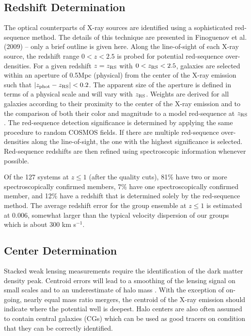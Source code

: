 \documentclass[12pt]{emulateapj}
\newcommand{\pgroup}{127 }      %
\newcommand{\eg}{{\it e.g.}}
\begin{document}
\subsection{Redshift Determination}\label{redshift_determination}

The optical counterparts of X-ray sources are identified using a
sophisticated red-sequence method. The details of this technique are
presented in Finoguenov et al. (2009) -- only a brief outline is given
here. Along the line-of-sight of each X-ray source, the redshift range
$0<z<2.5$ is probed for potential red-sequence over-densities. For a
given redshift $z=z_{\rm RS}$ with $0<z_{\rm RS}<2.5$, galaxies are
selected within an aperture of 0.5Mpc (physical) from the center of
the X-ray emission such that $|z_{\rm phot}-z_{\rm RS}|<0.2$. The
apparent size of the aperture is defined in terms of a physical scale
and will vary with $z_{\rm RS}$. Weights are derived for all
galaxies according to their proximity to the center of the X-ray
emission and to the comparison of both their color and magnitude to a
model red-sequence at $z_{\rm RS}$. The red-sequence detection
significance is determined by applying the same procedure to random
COSMOS fields. If there are multiple red-sequence over-densities along
the line-of-sight, the one with the highest significance is
selected. Red-sequence redshifts are then refined using spectroscopic
information whenever possible.

Of the \pgroup systems at $z \leq 1$ (after the quality cuts), 81\%
have two or more spectroscopically confirmed members, 7\% have one
spectroscopically confirmed member, and 12\% have a redshift that is
determined solely by the red-sequence method. The average redshift
error for the group ensemble at $z \leq 1$ is estimated at $0.006$,
somewhat larger than the typical velocity dispersion of our groups
which is about 300 km s$^{-1}$.

\subsection{Center Determination}\label{center_determination}

Stacked weak lensing measurements require the identification of the
dark matter density peak. Centroid errors will lead to a smoothing of
the lensing signal on small scales and to an underestimate of halo
mass \citep[\eg\ see discussion in][]{Johnston:2007}. With the
exception of on-going, nearly equal mass ratio mergers, the centroid of
the X-ray emission should indicate where the potential well is
deepest. Halo centers are also often assumed to contain central
galaxies (CGs) which can be used as good tracers on condition that
they can be correctly identified.
\end{document}
